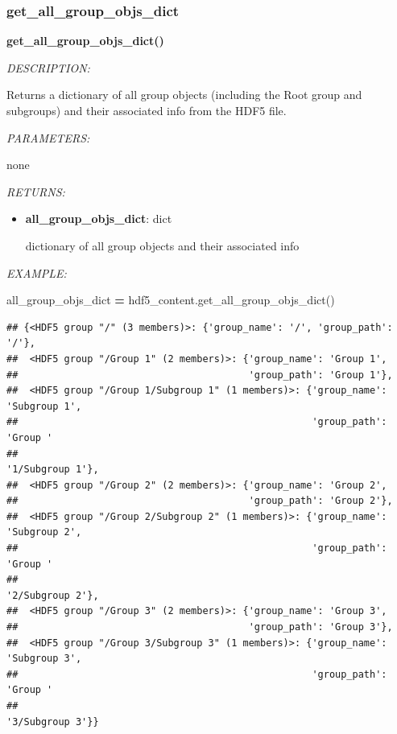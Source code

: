 \documentclass[
]{article}
\newenvironment{Shaded}{\begin{snugshade}}{\end{snugshade}}
\newcommand{\NormalTok}[1]{#1}
\newcommand{\OperatorTok}[1]{\textcolor[rgb]{0.81,0.36,0.00}{\textbf{#1}}}
\begin{document}
\hypertarget{get_all_group_objs_dict}{%
\subsubsection{get\_all\_group\_objs\_dict}\label{get_all_group_objs_dict}}

\textbf{get\_all\_group\_objs\_dict()}

\emph{DESCRIPTION:}

Returns a dictionary of all group objects (including the Root group and subgroups) and their associated info from the HDF5 file.

\emph{PARAMETERS:}

none

\emph{RETURNS:}

\begin{itemize}
\item
  \textbf{all\_group\_objs\_dict}: dict

  dictionary of all group objects and their associated info
\end{itemize}

\emph{EXAMPLE:}

\begin{Shaded}
\begin{Highlighting}[]
\NormalTok{all_group_objs_dict }\OperatorTok{=}\NormalTok{ hdf5_content.get_all_group_objs_dict()}
\end{Highlighting}
\end{Shaded}

\begin{verbatim}
## {<HDF5 group "/" (3 members)>: {'group_name': '/', 'group_path': '/'},
##  <HDF5 group "/Group 1" (2 members)>: {'group_name': 'Group 1',
##                                        'group_path': 'Group 1'},
##  <HDF5 group "/Group 1/Subgroup 1" (1 members)>: {'group_name': 'Subgroup 1',
##                                                   'group_path': 'Group '
##                                                                 '1/Subgroup 1'},
##  <HDF5 group "/Group 2" (2 members)>: {'group_name': 'Group 2',
##                                        'group_path': 'Group 2'},
##  <HDF5 group "/Group 2/Subgroup 2" (1 members)>: {'group_name': 'Subgroup 2',
##                                                   'group_path': 'Group '
##                                                                 '2/Subgroup 2'},
##  <HDF5 group "/Group 3" (2 members)>: {'group_name': 'Group 3',
##                                        'group_path': 'Group 3'},
##  <HDF5 group "/Group 3/Subgroup 3" (1 members)>: {'group_name': 'Subgroup 3',
##                                                   'group_path': 'Group '
##                                                                 '3/Subgroup 3'}}
\end{verbatim}
\end{document}
